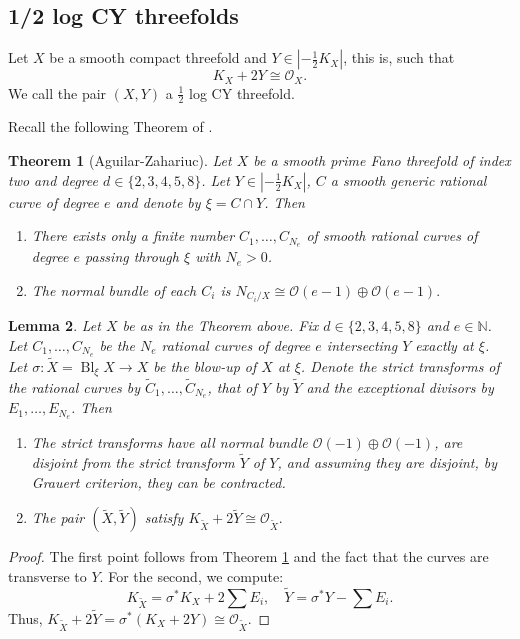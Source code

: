 \documentclass[11pt]{article}
\newtheorem{thm}{Theorem}[section]
\newtheorem{lem}[thm]{Lemma}
\theoremstyle{definition}
\newcommand{\abs}[1]{\left\vert#1\right\vert}
\newcommand{\OO}{\mathcal{O}}
\DeclareMathOperator{\Bl}{Bl}
\begin{document}
\subsection{1/2 log CY threefolds}\label{ss:12logCY}
Let $X$ be a smooth compact threefold and $Y\in \abs{-\frac{1}{2}K_X}$, this is, such that 
$$ K_X+2Y\cong \mathscr{O}_X .$$ 
We call the pair $(X,Y)$ a $\frac{1}{2}$ log CY threefold.

Recall the following Theorem of \cite{A26b}.

\begin{thm}[Aguilar-Zahariuc]\label{thm:AZ} 
Let $X$ be a smooth prime Fano threefold of index two and degree $d\in \{2,3,4,5,8\}$. Let $Y\in \abs{-\frac{1}{2}K_X}$, $C$ a smooth generic rational curve of degree $e$ and denote by $\xi=C\cap Y$. Then 
\begin{enumerate}
  \item There exists only a finite number $C_1, \ldots, C_{N_e}$ of smooth rational curves of degree $e$ passing through $\xi$ with $N_e>0$.
  \item The normal bundle of each $C_i$ is $N_{C_i/X}\cong \mathscr{O}(e-1)\oplus \mathscr{O}(e-1).$
\end{enumerate}
\end{thm}


\begin{lem}\label{lem:BlowHalf}
  Let $X$ be as in the Theorem above. Fix $d\in \{2,3,4,5,8\}$ and $e\in \mathbb{N}$. 
Let $C_1, \ldots, C_{N_e}$ be the $N_e$ rational curves of degree $e$ intersecting $Y$ exactly at $\xi$. 
Let $\sigma: \tilde{X} = \Bl_\xi X \to X$ be the blow-up of $X$ at $\xi$. 
Denote the strict transforms of the rational curves by $\tilde{C}_1, \ldots, \tilde{C}_{N_e}$, that of $Y$ by $\tilde Y$ and the exceptional divisors by $E_1, \ldots, E_{N_e}$. Then 
\begin{enumerate}
  \item The strict transforms have all normal bundle $\OO(-1)\oplus \OO(-1)$, are disjoint from the strict transform $\tilde{Y}$ of $Y$, and \emph{assuming they are disjoint,} by Grauert criterion, they can be contracted.  
  \item The pair $(\tilde X, \tilde Y)$ satisfy $K_{\tilde X}+2\tilde Y \cong \OO_{\tilde X}. $
\end{enumerate}
\end{lem}
\begin{proof}
  The first point follows from Theorem \ref{thm:AZ} and the fact that the curves are transverse to $Y$.
  For the second, we compute:
  $$K_{\tilde X}=\sigma^* K_X+2\sum E_i, \quad \tilde Y=\sigma^* Y-\sum E_i. $$
  Thus, $K_{\tilde X}+2\tilde Y =\sigma^*(K_X+2Y)\cong \OO_{\tilde X}.$
\end{proof}
\end{document}
